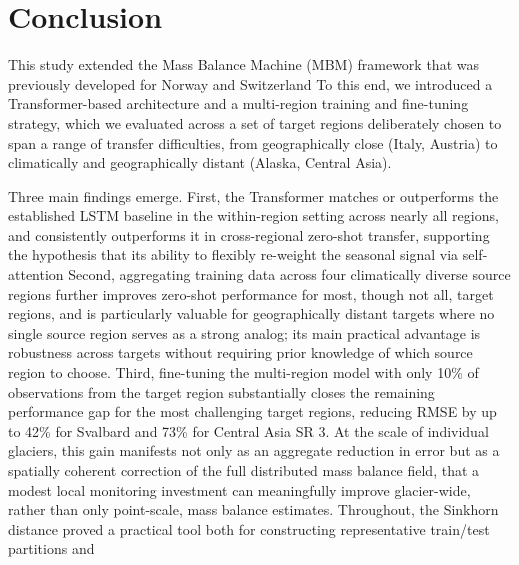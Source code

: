\documentclass[draft]{agujournal2019}
\begin{document}
\section{Conclusion}\label{sec:conclusion}
This study extended the Mass Balance Machine (MBM) framework that was previously developed for Norway \citep{Sjursen2025} and Switzerland \citep{vanderMeer_2026}  To this end, we introduced a Transformer-based architecture and a multi-region training and fine-tuning strategy, which we evaluated across a set of target regions deliberately chosen to span a range of transfer difficulties, from geographically close (Italy, Austria) to climatically and geographically distant (Alaska, Central Asia).

Three main findings emerge. First, the Transformer matches or outperforms the established LSTM baseline in the within-region setting across nearly all regions, and consistently outperforms it in cross-regional zero-shot transfer, supporting the hypothesis that its ability to flexibly re-weight the seasonal signal via self-attention  Second, aggregating training data across four climatically diverse source regions further improves zero-shot performance for most, though not all, target regions, and is particularly valuable for geographically distant targets where no single source region serves as a strong analog; its main practical advantage is robustness across targets without requiring prior knowledge of which source region to choose. Third, fine-tuning the multi-region model with only 10\% of observations from the target region substantially closes the remaining performance gap for the most challenging target regions, reducing RMSE by up to 42\% for Svalbard and 73\% for Central Asia SR 3. At the scale of individual glaciers, this gain manifests not only as an aggregate reduction in error but as a spatially coherent correction of the full distributed mass balance field,  that a modest local monitoring investment can meaningfully improve glacier-wide, rather than only point-scale, mass balance estimates. Throughout, the Sinkhorn distance proved a practical tool both for constructing representative train/test partitions and
\end{document}
